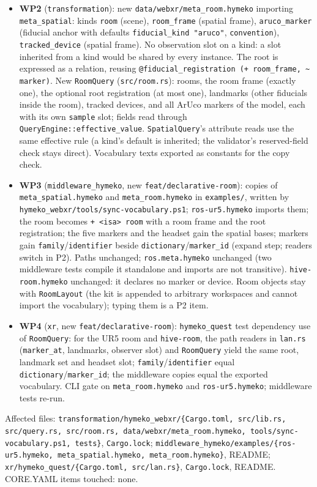 \documentclass[11pt]{article}
\begin{document}
\begin{itemize}
\item \textbf{WP2} (\texttt{transformation}): new \texttt{data/webxr/meta\_room.hymeko} importing
  \texttt{meta\_spatial}: kinds \texttt{room} (scene), \texttt{room\_frame} (spatial frame),
  \texttt{aruco\_marker} (fiducial anchor with defaults \texttt{fiducial\_kind "aruco"},
  \texttt{convention}), \texttt{tracked\_device} (spatial frame). No observation slot on a kind:
  a slot inherited from a kind would be shared by every instance. The root is expressed as a
  relation, reusing \texttt{@fiducial\_registration (+ room\_frame, \textasciitilde{} marker)}.
  New \texttt{RoomQuery} (\texttt{src/room.rs}): rooms, the room frame (exactly one), the optional
  root registration (at most one), landmarks (other fiducials inside the room), tracked devices,
  and all ArUco markers of the model, each with its own \texttt{sample} slot; fields read through
  \texttt{QueryEngine::effective\_value}. \texttt{SpatialQuery}'s attribute reads use the same
  effective rule (a kind's default is inherited; the validator's reserved-field check stays
  direct). Vocabulary texts exported as constants for the copy check.
\item \textbf{WP3} (\texttt{middleware\_hymeko}, new \texttt{feat/declarative-room}): copies of
  \texttt{meta\_spatial.hymeko} and \texttt{meta\_room.hymeko} in \texttt{examples/}, written by
  \texttt{hymeko\_webxr/tools/sync-vocabulary.ps1}; \texttt{ros-ur5.hymeko} imports them; the room
  becomes \texttt{+ <isa> room} with a room frame and the root registration; the five markers and
  the headset gain the spatial bases; markers gain \texttt{family}/\texttt{identifier} beside
  \texttt{dictionary}/\texttt{marker\_id} (expand step; readers switch in P2). Paths unchanged;
  \texttt{ros.meta.hymeko} unchanged (two middleware tests compile it standalone and imports are
  not transitive). \texttt{hive-room.hymeko} unchanged: it declares no marker or device.
  Room objects stay with \texttt{RoomLayout} (the kit is appended to arbitrary workspaces and
  cannot import the vocabulary); typing them is a P2 item.
\item \textbf{WP4} (\texttt{xr}, new \texttt{feat/declarative-room}): \texttt{hymeko\_quest} test
  dependency use of \texttt{RoomQuery}: for the UR5 room and \texttt{hive-room}, the path readers
  in \texttt{lan.rs} (\texttt{marker\_at}, landmarks, observer slot) and \texttt{RoomQuery} yield the
  same root, landmark set and headset slot; \texttt{family}/\texttt{identifier} equal
  \texttt{dictionary}/\texttt{marker\_id}; the middleware copies equal the exported vocabulary.
  CLI gate on \texttt{meta\_room.hymeko} and \texttt{ros-ur5.hymeko}; middleware tests re-run.
\end{itemize}
Affected files: \texttt{transformation/hymeko\_webxr/\{Cargo.toml, src/lib.rs, src/query.rs,
src/room.rs, data/webxr/meta\_room.hymeko, tools/sync-vocabulary.ps1, tests\}},
\texttt{Cargo.lock}; \texttt{middleware\_hymeko/examples/\{ros-ur5.hymeko, meta\_spatial.hymeko,
meta\_room.hymeko\}}, README; \texttt{xr/hymeko\_quest/\{Cargo.toml, src/lan.rs\}}, \texttt{Cargo.lock}, README.
CORE.YAML items touched: none.
\end{document}
